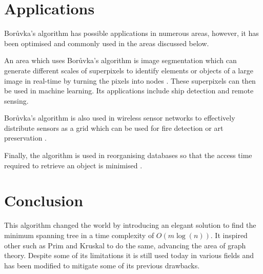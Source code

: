 \documentclass[a4paper,11pt]{article}
\begin{document}
\section{Applications}
Borůvka's algorithm has possible applications in numerous areas, however, it has been optimised and commonly used in the areas discussed below.

An area which uses Borůvka's algorithm is image segmentation which can generate different scales of superpixels to identify elements or objects of a large image in real-time by turning the pixels into nodes \cite{basavaprasad2014survey}. These superpixels can then be used in machine learning. Its applications include ship detection and remote sensing.

Borůvka's algorithm is also used in wireless sensor networks to effectively distribute sensors as a grid which can be used for fire detection or art preservation \cite{chen2019coverage} \cite{ikikardes2006routing}.

Finally, the algorithm is used in reorganising databases so that the access time required to retrieve an object is minimised \cite{gabow1984scaling} \cite{wietrzyk1999dynamic}.

\section{Conclusion}
This algorithm changed the world by introducing an elegant solution to find the minimum spanning tree in a time complexity of $O(m\log(n))$. It inspired other such as Prim and Kruskal to do the same, advancing the area of graph theory. Despite some of its limitations it is still used today in various fields and has been modified to mitigate some of its previous drawbacks. 





\end{document}
